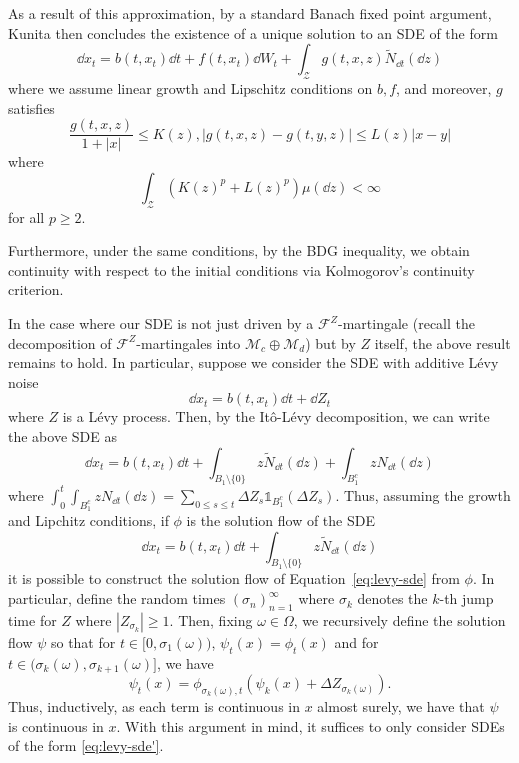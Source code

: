 \documentclass[]{article}
\theoremstyle{definition}
\theoremstyle{definition}
\begin{document}
As a result of this approximation, by a standard Banach fixed point argument, Kunita then concludes 
the existence of a unique solution to an SDE of the form 
\[\dd x_t = b(t, x_t)\dd t + f(t, x_t) \dd W_t + \int_\mathcal{Z} g(t, x, z) \tilde N_{\dd t}(\dd z)\]
where we assume linear growth and Lipschitz conditions on \(b, f\), and moreover, \(g\) satisfies 
\[\frac{g(t, x, z)}{1 + |x|} \le K(z), |g(t, x, z) - g(t, y, z)| \le L(z) |x - y|\]
where 
\[\int_\mathcal{Z} (K(z)^p + L(z)^p) \mu(\dd z) < \infty\]
for all \(p \ge 2\).

Furthermore, under the same conditions, by the BDG inequality, we obtain continuity with respect to the 
initial conditions via Kolmogorov's continuity criterion. 

In the case where our SDE is not just driven by a \(\mathcal{F}^Z\)-martingale (recall the decomposition 
of \(\mathcal{F}^Z\)-martingales into \(\mathcal{M}_c \oplus \mathcal{M}_d\)) but by \(Z\) itself, 
the above result remains to hold. In particular, suppose we consider the SDE with additive L\'evy noise
\begin{equation}\label{eq:levy-sde}
  \dd x_t = b(t, x_t) \dd t + \dd Z_t
\end{equation}
where \(Z\) is a L\'evy process. Then, by the It\^o-L\'evy decomposition, we can write the above 
SDE as
\[\dd x_t = b(t, x_t) \dd t + \int_{B_1 \setminus\{0\}} z \tilde N_{\dd t}(\dd z) + \int_{B_1^c} z N_{\dd t}(\dd z)\]
where \(\int_0^t \int_{B_1^c} z N_{\dd t}(\dd z) = \sum_{0 \le s \le t} \Delta Z_s \mathbb{1}_{B_1^c}(\Delta Z_s)\).
Thus, assuming the growth and Lipchitz conditions, if \(\phi\) is the solution flow of the SDE 
\begin{equation}\label{eq:levy-sde'}
  \dd x_t = b(t, x_t) \dd t + \int_{B_1 \setminus\{0\}} z \tilde N_{\dd t}(\dd z)
\end{equation}
it is possible to construct the solution flow of Equation~\eqref{eq:levy-sde} from \(\phi\). In particular, 
define the random times \((\sigma_n)_{n = 1}^\infty\) where \(\sigma_k\) denotes the \(k\)-th jump time 
for \(Z\) where \(|Z_{\sigma_k}| \ge 1\). Then, fixing \(\omega \in \Omega\), we recursively define the 
solution flow \(\psi\) so that for \(t \in [0, \sigma_1(\omega))\), \(\psi_t(x) = \phi_t(x)\) and for 
\(t \in (\sigma_k(\omega), \sigma_{k + 1}(\omega)]\), we have 
\[\psi_t(x) = \phi_{\sigma_k(\omega), t}(\psi_k(x) + \Delta Z_{\sigma_k(\omega)}).\]
Thus, inductively, as each term is continuous in \(x\) almost surely, we have that \(\psi\) is continuous 
in \(x\). With this argument in mind, it suffices to only consider SDEs of the form \eqref{eq:levy-sde'}.
\end{document}
